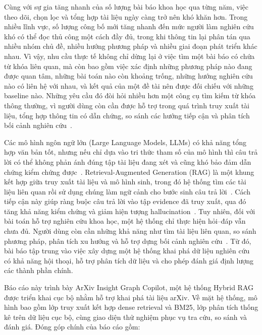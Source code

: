 \documentclass[conference]{IEEEtran}
\newcommand{\systemname}{ArXiv Insight Graph Copilot}
\begin{document}
Cùng với sự gia tăng nhanh của số lượng bài báo khoa học qua từng năm, việc theo dõi, chọn lọc và tổng hợp tài liệu ngày càng trở nên khó khăn hơn. Trong nhiều lĩnh vực, số lượng công bố mới tăng nhanh đến mức người làm nghiên cứu khó có thể đọc thủ công một cách đầy đủ, trong khi thông tin lại phân tán qua nhiều nhóm chủ đề, nhiều hướng phương pháp và nhiều giai đoạn phát triển khác nhau. Vì vậy, nhu cầu thực tế không chỉ dừng lại ở việc tìm một bài báo có chứa từ khóa liên quan, mà còn bao gồm việc xác định những phương pháp nào đang được quan tâm, những bài toán nào còn khoảng trống, những hướng nghiên cứu nào có liên hệ với nhau, và kết quả của một đề tài nên được đối chiếu với những baseline nào. Những yêu cầu đó đòi hỏi nhiều hơn một công cụ tìm kiếm từ khóa thông thường, vì người dùng còn cần được hỗ trợ trong quá trình truy xuất tài liệu, tổng hợp thông tin có dẫn chứng, so sánh các hướng tiếp cận và phân tích bối cảnh nghiên cứu~\cite{zhou2025aiResearchSurvey,hongwimol2021esra}.

Các mô hình ngôn ngữ lớn (Large Language Models, LLMs) có khả năng tổng hợp văn bản tốt, nhưng nếu chỉ dựa vào tri thức tham số của mô hình thì câu trả lời có thể không phản ánh đúng tập tài liệu đang xét và cũng khó bảo đảm dẫn chứng kiểm chứng được~\cite{gao2023ragSurvey,lewis2020retrieval}. Retrieval-Augmented Generation (RAG) là một khung kết hợp giữa truy xuất tài liệu và mô hình sinh, trong đó hệ thống tìm các tài liệu liên quan rồi sử dụng chúng làm ngữ cảnh cho bước sinh câu trả lời~\cite{lewis2020retrieval}. Cách tiếp cận này giúp ràng buộc câu trả lời vào tập evidence đã truy xuất, qua đó tăng khả năng kiểm chứng và giảm hiện tượng hallucination~\cite{gao2023ragSurvey,lewis2020retrieval}. Tuy nhiên, đối với bài toán hỗ trợ nghiên cứu khoa học, một hệ thống chỉ thực hiện hỏi--đáp vẫn chưa đủ. Người dùng còn cần những khả năng như tìm tài liệu liên quan, so sánh phương pháp, phân tích xu hướng và hỗ trợ dựng bối cảnh nghiên cứu~\cite{zhou2025aiResearchSurvey,hongwimol2021esra}. Từ đó, bài báo tập trung vào việc xây dựng một hệ thống khai phá dữ liệu nghiên cứu có khả năng hội thoại, hỗ trợ phân tích dữ liệu và cho phép đánh giá định lượng các thành phần chính.

Báo cáo này trình bày \systemname, một hệ thống Hybrid RAG được triển khai cục bộ nhằm hỗ trợ khai phá tài liệu arXiv. Về mặt hệ thống, mô hình bao gồm lớp truy xuất kết hợp dense retrieval và BM25, lớp phân tích thống kê trên dữ liệu cục bộ, cùng giao diện thử nghiệm phục vụ tra cứu, so sánh và đánh giá. Đóng góp chính của báo cáo gồm:
\end{document}
